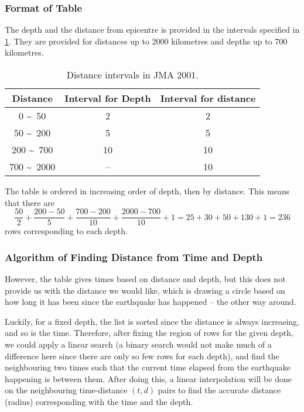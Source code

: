 \subsubsection{Format of Table}

The depth and the distance from epicentre is provided in the intervals specified in \ref{tab:dist-jma-2001}. They are provided for distances up to 2000 kilometres and depths up to 700 kilometres.

\begin{table}[htp]
    \centering

    \begin{tabular}{ccc}
        Distance                  & Interval for Depth & Interval for distance \\
        \hline
        0 \textasciitilde\ 50     & 2                  & 2                     \\
        50 \textasciitilde\ 200   & 5                  & 5                     \\
        200 \textasciitilde\ 700  & 10                 & 10                    \\
        700 \textasciitilde\ 2000 & --                 & 10
    \end{tabular}
    \caption{Distance intervals in JMA 2001.}
    \label{tab:dist-jma-2001}
\end{table}

The table is ordered in increasing order of depth, then by distance. This means that there are
\[
    \frac{50}{2} + \frac{200 - 50}{5} + \frac{700 - 200}{10} + \frac{2000 - 700}{10} + 1 = 25 + 30 + 50 + 130 + 1 = 236
\]
rows corresponding to each depth.

\subsubsection{Algorithm of Finding Distance from Time and Depth}

However, the table gives times based on distance and depth, but this does not provide us with the distance we would like, which is drawing a circle based on how long it has been since the earthquake has happened -- the other way around.

Luckily, for a fixed depth, the list is sorted since the distance is always increasing, and so is the time. Therefore, after fixing the region of rows for the given depth, we could apply a linear search (a binary search would not make much of a difference here since there are only so few rows for each depth), and find the neighbouring two times such that the current time elapsed from the earthquake happening is between them. After doing this, a linear interpolation will be done on the neighbouring time-distance \((t, d)\) pairs to find the accurate distance (radius) corresponding with the time and the depth.

